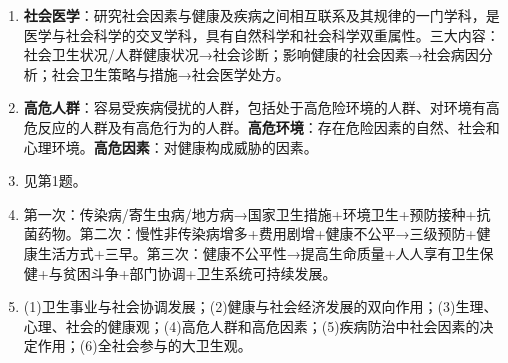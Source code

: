 \begin{enumerate}[leftmargin=*, itemsep=5pt]
    \item \textbf{社会医学}：研究社会因素与健康及疾病之间相互联系及其规律的一门学科，是医学与社会科学的交叉学科，具有自然科学和社会科学双重属性。三大内容：社会卫生状况/人群健康状况→社会诊断；影响健康的社会因素→社会病因分析；社会卫生策略与措施→社会医学处方。
    \item \textbf{高危人群}：容易受疾病侵扰的人群，包括处于高危险环境的人群、对环境有高危反应的人群及有高危行为的人群。\textbf{高危环境}：存在危险因素的自然、社会和心理环境。\textbf{高危因素}：对健康构成威胁的因素。
    \item 见第1题。
    \item 第一次：传染病/寄生虫病/地方病→国家卫生措施+环境卫生+预防接种+抗菌药物。第二次：慢性非传染病增多+费用剧增+健康不公平→三级预防+健康生活方式+三早。第三次：健康不公平性→提高生命质量+人人享有卫生保健+与贫困斗争+部门协调+卫生系统可持续发展。
    \item (1)卫生事业与社会协调发展；(2)健康与社会经济发展的双向作用；(3)生理、心理、社会的健康观；(4)高危人群和高危因素；(5)疾病防治中社会因素的决定作用；(6)全社会参与的大卫生观。
\end{enumerate}

\newpage
